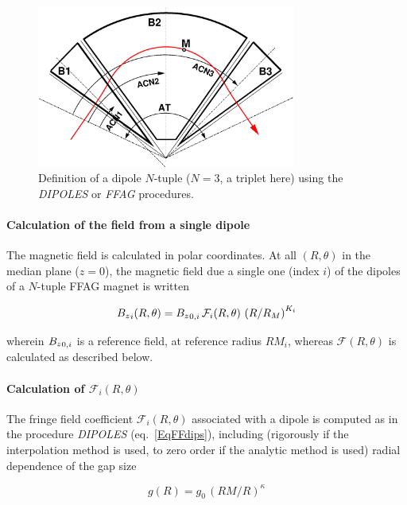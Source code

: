 \begin{figure}[h]
 \begin{center}
\includegraphics[width=8.5cm]{ffagTriplet.eps}  
 \caption{ \label{figFFAG}
Definition of a dipole $N$-tuple ($N=3$, a triplet here) using  the \textsl{DIPOLES} or  \textsl{FFAG}  procedures. 
}
  \end{center}
\end{figure}


\paragraph{Calculation of the field from a single dipole} 

 \noindent The magnetic field is calculated in  polar
coordinates.  At all $(R,\theta)$ in the median plane ($z=0$), the 
magnetic field  due  a single one (index $i$) of the  dipoles  of a $N$-tuple FFAG  magnet is written 

$$ {B_z}_i(R,\theta) =  {B_z}_{0,i} \, \mathcal{F}_i(R,\theta) \, \left(   R/R_M \right)^{K_i}  $$

\noindent wherein ${B_z}_{0,i}$  is a reference field, at reference radius  $RM_{i}$, 
 whereas $ \mathcal{F}(R,\theta)$ is calculated as described below. 



\paragraph{Calculation of $\mathcal{F}_i(R,\theta) $} 

\noindent The fringe field coefficient  $\mathcal{F}_i(R,\theta) $ associated with a  dipole is computed as in the 
procedure  \textsl{DIPOLES} (eq.~\ref{EqFFdips}), including (rigorously if the interpolation method is 
used, to zero order if the analytic method is used)  radial dependence of the gap size 

\begin{equation}
\label{EqggvsR}
g(R) = g_0 \, (RM/R)^{\kappa}
\end{equation}

